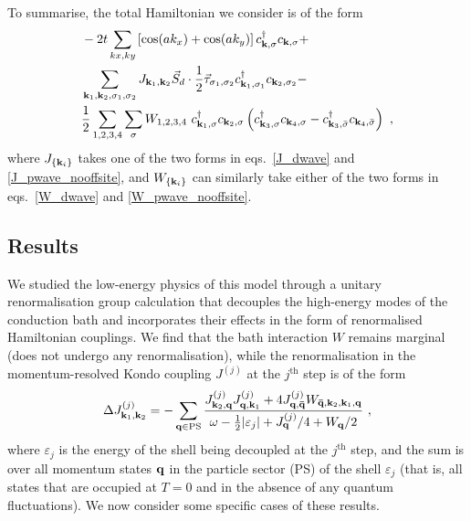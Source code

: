\documentclass[reprint,hidelinks]{revtex4-2}
\begin{document}
To summarise, the total Hamiltonian we consider is of the form
\begin{equation}\begin{aligned}\label{hamiltonian}
	&-2t\sum_{kx,k y}\left[\cos(ak_x) + \cos(ak_y)\right] c^\dagger_{{\bf k},\sigma}c_{{\bf k},\sigma} + \\
	 &\sum_{{\bf k}_1, {\bf k}_2, \sigma_1, \sigma_2} J_{{\bf k}_1, {\bf k}_2} \vec{S}_d\cdot\frac{1}{2}\vec{\tau}_{\sigma_1,\sigma_2} c^\dagger_{{\bf k}_1,\sigma_1}c_{{\bf k}_2,\sigma_2} -\\
	 &\frac{1}{2}\sum_{1, 2, 3, 4}\sum_\sigma W_{1,2,3,4}~ c^\dagger_{{\bf k}_1,\sigma}c_{{\bf k}_2,\sigma}\left(c^\dagger_{{\bf k}_3,\sigma}c_{{\bf k}_4,\sigma} - c^\dagger_{{\bf k}_3,\bar\sigma}c_{{\bf k}_4,\bar\sigma}\right)~,
\end{aligned}\end{equation}
where \(J_{\left\{ {\bf k}_i \right\} }\) takes one of the two forms in eqs.~\ref{J_dwave} and \ref{J_pwave_nooffsite}, and \(W_{\left\{{\bf k}_i\right\}}\) can similarly take either of the two forms in eqs.~\ref{W_dwave} and \ref{W_pwave_nooffsite}. 
\subsection{Results}
We studied the low-energy physics of this model through a unitary renormalisation group calculation that decouples the high-energy modes of the conduction bath and incorporates their effects in the form of renormalised Hamiltonian couplings. We find that the bath interaction \(W\) remains marginal (does not undergo any renormalisation), while the renormalisation in the momentum-resolved Kondo coupling \(J^{(j)}\) at the \(j^\text{th}\) step is of the form
\begin{equation}\begin{aligned}\label{KondoRGequation}
	\Delta J^{(j)}_{{\bf k}_1, {\bf k}_2} = -\sum_{{\bf q} \in \text{PS}} \frac{J^{(j)}_{{\bf k}_2,{\bf q}} J^{(j)}_{{\bf q},{\bf k}_1} + 4J^{(j)}_{{\bf q}, {\bf \bar q}} W_{{\bf \bar q}, {\bf k}_2, {\bf k}_1, {\bf q}}}{\omega - \frac{1}{2}|\varepsilon_j| + J^{(j)}_{{\bf q}}/4 + W_{{\bf q}}/2}~,
\end{aligned}\end{equation}
where \(\varepsilon_j\) is the energy of the shell being decoupled at the \(j^\text{th}\) step, and the sum is over all momentum states \({\bf q}\) in the particle sector (PS) of the shell \(\varepsilon_j\) (that is, all states that are occupied at \(T=0\) and in the absence of any quantum fluctuations). We now consider some specific cases of these results.
\end{document}
